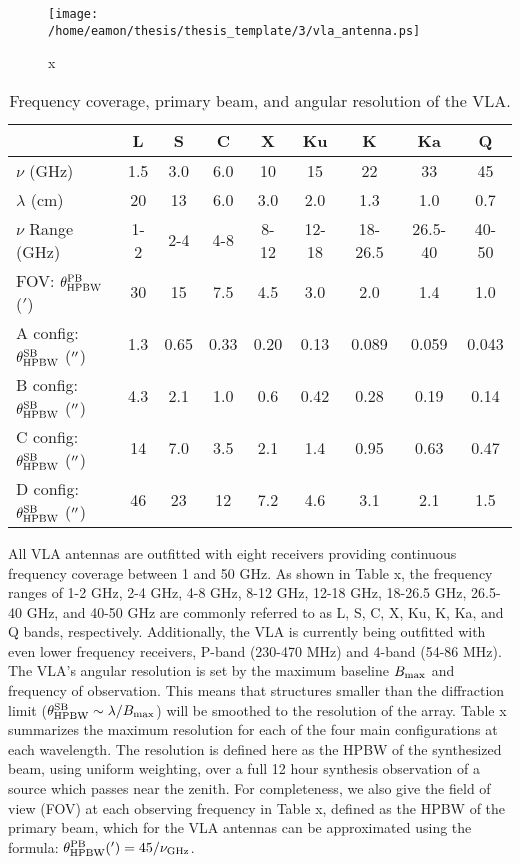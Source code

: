 \begin{figure}[hbt!]
\centering 
          \texttt{[image: /home/eamon/thesis/thesis\_template/3/vla\_antenna.ps]}
\caption[x]{x}
\label{fig3.1}
\end{figure}

\begin{table}
\begin{center}
\caption[Frequency coverage, primary beam, and angular resolution of the VLA.]
{Frequency coverage, primary beam, and angular resolution of the VLA.}
\begin{tabular}{lcccccccc}
\hline
\hline
\rule{0pt}{2.5ex} &  L& S&C&X&Ku&K&Ka&Q\\
\hline
\rule{0pt}{2.5ex}$\nu$ (GHz)& 1.5& 3.0&6.0&10&15&22&33&45\\
$\lambda$ (cm)& 20& 13&6.0&3.0&2.0&1.3&1.0&0.7\\
$\nu$ Range (GHz)& 1-2& 2-4&4-8&8-12&12-18&18-26.5&26.5-40&40-50\\
FOV: $\theta_{\rm{HPBW}} ^{\rm{PB}}$ ($'$)& 30& 15&7.5 &4.5 &3.0&2.0&1.4&1.0\\
A config: $\theta_{\rm{HPBW}}^{\rm{SB}}$ ($^{\prime\prime}$)&  1.3& 0.65&0.33&0.20&0.13&0.089&0.059&0.043\\
B config: $\theta_{\rm{HPBW}}^{\rm{SB}}$ ($^{\prime\prime}$)&  4.3& 2.1&1.0&0.6&0.42&0.28&0.19&0.14\\
C config: $\theta_{\rm{HPBW}}^{\rm{SB}}$ ($^{\prime\prime}$)&  14& 7.0&3.5&2.1&1.4&0.95&0.63&0.47\\
D config: $\theta_{\rm{HPBW}}^{\rm{SB}}$ ($^{\prime\prime}$)&  46& 23&12&7.2&4.6&3.1&2.1&1.5\\
\hline
\end{tabular}
\label{tab:3.1}
\end{center}
\end{table}
All VLA antennas are outfitted with eight receivers providing continuous frequency coverage between 1 and 50 GHz. As shown in Table x, the frequency ranges of 1-2 GHz, 2-4 GHz, 4-8 GHz, 8-12 GHz, 12-18 GHz, 18-26.5 GHz, 26.5-40 GHz, and 40-50 GHz are commonly referred to as L, S, C, X, Ku, K, Ka, and Q bands, respectively. Additionally, the VLA is currently being outfitted with even lower frequency receivers, P-band (230-470 MHz) and 4-band (54-86 MHz). The VLA's angular resolution is set by the maximum baseline $B_{\rm{max}}$ and frequency of observation. This means that structures smaller than the diffraction limit ($\theta_{\rm{HPBW}}^{\rm{SB}} \sim \lambda/B_{\rm{max}}$) will be smoothed to the resolution of the array. Table x summarizes the maximum resolution for each of the four main configurations at each wavelength. The resolution is defined here as the HPBW of the synthesized beam, using uniform weighting, over a full 12 hour synthesis observation of a source which passes near the zenith. For completeness, we also give the field of view (FOV) at each observing frequency in Table x, defined as the HPBW  of the primary beam, which for the VLA antennas can be approximated using the formula: $\theta_{\rm{HPBW}} ^{\rm{PB}} (')= 45/\nu _{\rm{GHz}}$. 

